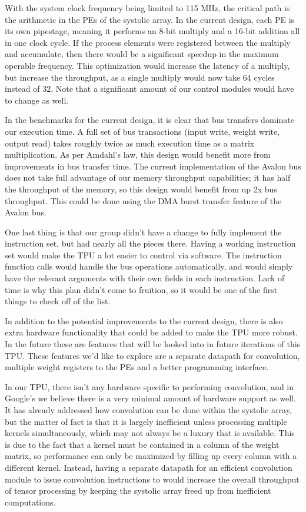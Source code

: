 \documentclass[11pt, conference, onecolumn]{IEEEtran}
\begin{document}
    With the system clock frequency being limited to 115 MHz, the critical path is the
    arithmetic in the PEs of the systolic array. In the current design, each PE is its own
    pipestage, meaning it performs an 8-bit multiply and a 16-bit addition all in one
    clock cycle. If the process elements were registered between the multiply and
    accumulate, then there would be a significant speedup in the maximum operable
    frequency. This optimization would increase the latency of a multiply, but increase the throughput, as a single multiply would now take 64 cycles instead of 32. Note that a
    significant amount of our control modules would have to change as well.

    In the benchmarks for the current design, it is clear that bus transfers dominate our
    execution time. A full set of bus transactions (input write, weight write, output
    read) takes roughly twice as much execution time as a matrix multiplication. As per
    Amdahl’s law, this design would benefit more from improvements in bus transfer time.
    The current implementation of the Avalon bus does not take full advantage of our
    memory throughput capabilities; it has half the throughput of the memory, so this
    design would benefit from up 2x bus throughput. This could be done using the DMA
    burst transfer feature of the Avalon bus.

    One last thing is that our group didn’t have a change to fully implement the
    instruction set, but had nearly all the pieces there. Having a working instruction set
    would make the TPU a lot easier to control via software. The instruction function
    calls would handle the bus operations automatically, and would simply have the
    relevant arguments with their own fields in each instruction. Lack of time is why this
    plan didn’t come to fruition, so it would be one of the first things to check off of
    the list.

    In addition to the potential improvements to the current design, there is also extra
    hardware functionality that could be added to make the TPU more robust. In the future
    these are features that will be looked into in future iterations of this TPU. These
    features we’d like to explore are a separate datapath for convolution, multiple weight
    registers to the PEs and a better programming interface.

    In our TPU, there isn’t any hardware specific to performing convolution, and in
    Google’s we believe there is a very minimal amount of hardware support as well.
    It has already addressed how convolution can be done within the systolic array, but
    the matter of fact is that it is largely inefficient unless processing multiple
    kernels simultaneously, which may not always be a luxury that is available. This is
    due to the fact that a kernel must be contained in a column of the weight matrix, so
    performance can only be maximized by filling up every column with a different kernel.
    Instead, having a separate datapath for an efficient convolution module to issue
    convolution instructions to would increase the overall throughput of tensor processing
    by keeping the systolic array freed up from inefficient computations.
\end{document}
